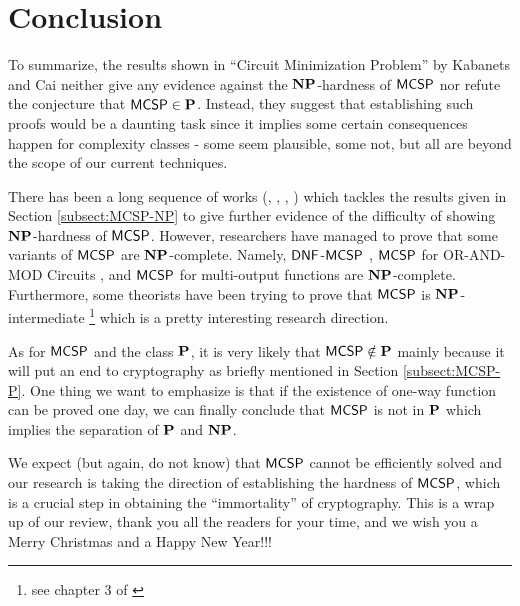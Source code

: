 \documentclass[11pt]{article}
\begin{document}
\section{Conclusion}


To summarize, the results shown in ``Circuit Minimization Problem'' by Kabanets and Cai neither give any evidence against the $\NP$-hardness of $\mathprob{MCSP}$ nor refute the conjecture that $\mathprob{MCSP} \in \P$. Instead, they suggest that establishing such proofs would be a daunting task since it implies some certain consequences happen for complexity classes - some seem plausible, some not, but all are beyond the scope of our current techniques.

There has been a long sequence of works (\cite{hitchcock2015np}, \cite{allender2017minimum}, \cite{murray2017non}, \cite{allender2019new}) which tackles the results given in Section \ref{subsect:MCSP-NP} to give further evidence of the difficulty of showing $\NP$-hardness of $\mathprob{MCSP}$. However, researchers have managed to prove that some variants of $\mathprob{MCSP}$ are $\NP$-complete. Namely, $\mathprob{DNF}$-$\mathprob{MCSP}$ \cite{masek1979some}, $\mathprob{MCSP}$ for OR-AND-MOD Circuits \cite{hirahara2018np}, and $\mathprob{MCSP}$ for multi-output functions \cite{ilango2020np} are $\NP$-complete. Furthermore, some theorists have been trying to prove that $\mathprob{MCSP}$ is $\NP$-intermediate \footnote{see chapter 3 of \cite{arora2009}} which is a pretty interesting research direction.

As for $\mathprob{MCSP}$ and the class $\P$, it is very likely that $\mathprob{MCSP} \notin \P$ mainly because it will put an end to cryptography as briefly mentioned in Section \ref{subsect:MCSP-P}. One thing we want to emphasize is that if the existence of one-way function can be proved one day, we can finally conclude that $\mathprob{MCSP}$ is not in $\P$ which implies the separation of $\P$ and $\NP$.

We expect (but again, do not know) that $\mathprob{MCSP}$ cannot be efficiently solved and our research is taking the direction of establishing the hardness of $\mathprob{MCSP}$, which is a crucial step in obtaining the ``immortality'' of cryptography. This is a wrap up of our review, thank you all the readers for your time, and we wish you a Merry Christmas and a Happy New Year!!!



\end{document}
